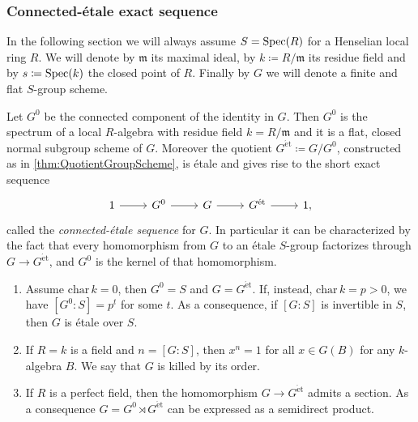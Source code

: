 \subsubsection{Connected-étale exact sequence}
In the following section we will always assume 
$S = \operatorname{Spec}(R)$	for a Henselian local ring $R$.
We will denote by $\mathfrak{m}$ its maximal ideal, by $k \coloneqq R/\mathfrak{m}$
its residue field and by $s \coloneqq \operatorname{Spec}(k)$ the closed point of $R$.
Finally by $G$ we will denote a finite and flat $S$-group scheme.

\begin{thm}\label{thm:ConnectedEtaleSequenceGS}
	Let $G^0$ be the connected component of the identity in $G$.
	Then $G^0$ is the spectrum of a local $R$-algebra with residue field $k = R/\mathfrak{m}$
	and it is a flat, closed normal subgroup scheme of $G$.
	Moreover the quotient $G^{\mathrm{\acute et}} \coloneqq G/G^0$,
	constructed as in \cref{thm:QuotientGroupScheme},
	is étale and gives rise to the short exact sequence
	\begin{equation*}
	\begin{tikzcd}
		1 \arrow[r, "", rightarrow] &
		G^0 \arrow[r, "", rightarrow] &
		G \arrow[r, "", rightarrow] &
		G^{\mathrm{\acute et}} \arrow[r, "", rightarrow] &
		1
	,\end{tikzcd}
	\end{equation*}
	called the \emph{connected-étale sequence} for $G$.
	In particular it can be characterized by the fact that every homomorphism
	from $G$ to an étale $S$-group factorizes through $G \to G^{\mathrm{\acute et}}$,
	and $G^0$ is the kernel of that homomorphism.
\end{thm}


\begin{prop}\label{prop:PropertiesConnectedEtale}
\leavevmode\vspace{-.2\baselineskip}
\begin{enumerate}
	\item Assume $\mathrm{char}\, k = 0$, then $G^0 = S$
		and $G = G^{\mathrm{\acute et}}$.
		If, instead, $\mathrm{char}\, k = p > 0$, we have
		$[G^0:S] = p^t$ for some $t$.
		As a consequence, if $[G:S]$ is invertible in $S$, then
		$G$ is étale over $S$.

	\item If $R = k$ is a field and $n = [G:S]$, then $x^n = 1$
		for all $x \in G(B)$ for any $k$-algebra $B$.
		We say that $G$ is killed by its order.

	\item If $R$ is a perfect field, then the homomorphism
		$G \to  G^{\mathrm{\acute et}}$ admits a section. 
		As a consequence $G = G^0 \rtimes G^{\mathrm{\acute et}}$
		can be expressed as a semidirect product.
\end{enumerate}
\end{prop}


